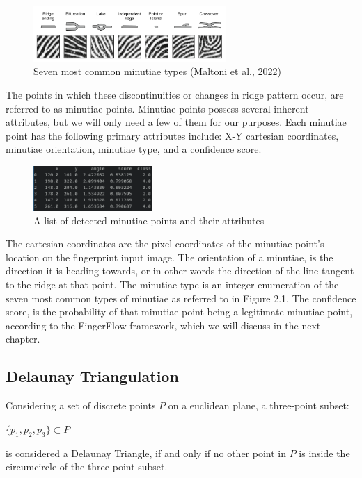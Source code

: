 \documentclass[fyp]{socreport}
\begin{document}
\begin{figure}[H]
	\centering
	\includegraphics[width=0.65\textwidth]
	{minutiae_types}
	\caption{Seven most common minutiae types (Maltoni et al., 2022)}
\end{figure}

\newpage The points in which these discontinuities or changes in ridge pattern occur, are referred to as minutiae points. Minutiae points possess several inherent attributes, but we will only need a few of them for our purposes. Each minutiae point has the following primary attributes include: X-Y cartesian coordinates, minutiae orientation, minutiae type, and a confidence score.

\begin{figure}[H]
	\centering
	\includegraphics[width=0.4\textwidth]
	{minutiae_pandas}
	\caption{A list of detected minutiae points and their attributes}
\end{figure}

The cartesian coordinates are the pixel coordinates of the minutiae point's location on the fingerprint input image. The orientation of a minutiae, is the direction it is heading towards, or in other words the direction of the line tangent to the ridge at that point. The minutiae type is an integer enumeration of the seven most common types of minutiae as referred to in Figure 2.1. The confidence score, is the probability of that minutiae point being a legitimate minutiae point, according to the FingerFlow framework, which we will discuss in the next chapter.

\subsection{Delaunay Triangulation}
Considering a set of discrete points $P$ on a euclidean plane, a three-point subset:

\begin{center}
	$\{p_1, p_2, p_3\} \subset P$
\end{center}
 is considered a Delaunay Triangle, if and only if no other point in $P$ is inside the circumcircle of the three-point subset. \cite{delaunay34trig}
 
\end{document}
